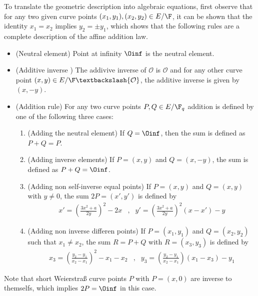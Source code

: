 To translate the geometric description into algebraic equations, first observe that for any two given curve points $(x_1,y_1), (x_2,y_2)\in E/\F$, it can be shown that the identity $x_1=x_2$ implies $y_2=\pm y_1$, which shows that the following rules are a complete description of the affine addition law.
\begin{itemize}
\item (Neutral element) Point at infinity $\Oinf$ is the neutral element.
\item (Additive inverse ) The addivive inverse of $\mathcal{O}$ is $\mathcal{O}$ and for any other curve point $(x,y) \in E/\F\textbackslash \{\mathcal{O}\}$, the additive inverse is given by $(x,-y)$.
\item (Addition rule) For any two curve points $P, Q \in E/\F_q$ addition is defined by one of the following three cases:
\begin{enumerate}
\item (Adding the neutral element) If $Q=\Oinf$, then the sum is defined as $P+Q=P$.
\item (Adding inverse elements)  If $P=(x,y)$ and $Q=(x,-y)$, the sum is defined as $P+Q=\Oinf$.
\item (Adding non self-inverse equal points) If $P=(x,y)$ and $Q=(x,y)$ with $y\neq 0$, the sum $2P=(x',y')$ is defined by
$$
\begin{array}{llr}
x' = \left(\frac{3x^2+a}{2y}\right)^2 -2x &,&
y' = \left(\frac{3x^2+a}{2y}\right)^2\left(x-x'\right) - y
\end{array} 
$$
\item (Adding non inverse differen points) If $P=(x_1,y_1)$ and $Q=(x_2,y_2)$ such that $x_1 \neq x_2$, the sum $R=P+Q$ with $R=(x_3,y_3)$ is defined by
$$
\begin{array}{llr}
x_3 = \left(\frac{y_2-y_1}{x_2-x_1}\right)^2 -x_1-x_2 &, &
y_3 = \left(\frac{y_2-y_1}{x_2-x_1} \right)\left(x_1-x_3\right) - y_1
\end{array} 
$$
\end{enumerate}
 
\end{itemize} 
Note that short Weierstraß curve points $P$ with $P=(x,0)$ are inverse to themselfs, which implies $2P=\Oinf$ in this case.

